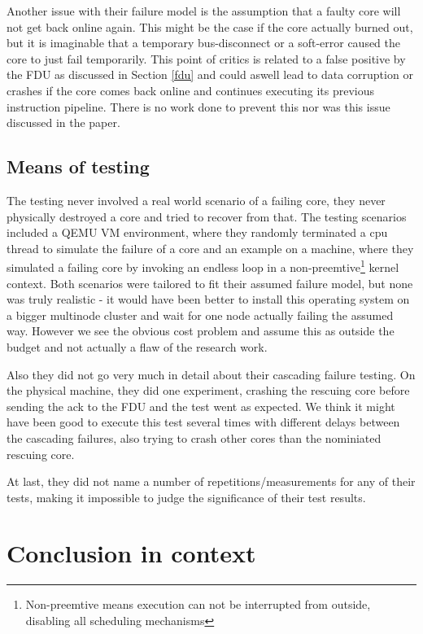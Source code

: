 \documentclass[a4paper,10pt,twoside]{article}
\begin{document}
Another issue with their failure model is the assumption that a faulty core will not get back online again. This might be the case if the core actually burned out, but it is imaginable that a temporary bus-disconnect or a soft-error caused the core to just fail temporarily. This point of critics is related to a false positive by the FDU as discussed in Section \ref{fdu} and could aswell lead to data corruption or crashes if the core comes back online and continues executing its previous instruction pipeline. There is no work done to prevent this nor was this issue discussed in the paper.

\subsection{Means of testing}
The testing never involved a real world scenario of a failing core, they never physically destroyed a core and tried to recover from that. The testing scenarios included a QEMU VM environment, where they randomly terminated a cpu thread to simulate the failure of a core and an example on a machine, where they simulated a failing core by invoking an endless loop in a non-preemtive\footnote{Non-preemtive means execution can not be interrupted from outside, disabling all scheduling mechanisms} kernel context. Both scenarios were tailored to fit their assumed failure model, but none was truly realistic - it would have been better to install this operating system on a bigger multinode cluster and wait for one node actually failing the assumed way. However we see the obvious cost problem and assume this as outside the budget and not actually a flaw of the research work.

Also they did not go very much in detail about their cascading failure testing. On the physical machine, they did one experiment, crashing the rescuing core before sending the ack to the FDU and the test went as expected. We think it might have been good to execute this test several times with different delays between the cascading failures, also trying to crash other cores than the nominiated rescuing core.

At last, they did not name a number of repetitions/measurements for any of their tests, making it impossible to judge the significance of their test results.

\section{Conclusion in context}
\end{document}
